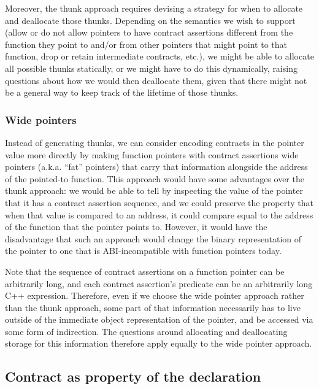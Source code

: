 Moreover, the thunk approach requires devising a strategy for when to allocate and deallocate those thunks. Depending on the semantics we wish to support (allow or do not allow pointers to have contract assertions different from the function they point to and/or from other pointers that might point to that function, drop or retain intermediate contracts, etc.), we might be able to allocate all possible thunks statically, or we might have to do this dynamically, raising questions about how we would then deallocate them, given that there might not be a general way to keep track of the lifetime of those thunks.


\subsubsection{Wide pointers}

Instead of generating thunks, we can consider encoding contracts in the pointer value more directly by making function pointers with contract assertions wide pointers (a.k.a. ``fat'' pointers) that carry that information alongside the address of the pointed-to function. This approach would have some advantages over the thunk approach: we would be able to tell by inspecting the value of the pointer that it has a contract assertion sequence, and we could preserve the property that when that value is compared to an address, it could compare equal to the address of the function that the pointer points to. However, it would have the disadvantage that such an approach would change the binary representation of the pointer to one that is ABI-incompatible with function pointers today.

Note that the sequence of contract assertions on a function pointer can be arbitrarily long, and each contract assertion's predicate can be an arbitrarily long C++ expression. Therefore, even if we choose the wide pointer approach rather than the thunk approach, some part of that information necessarily has to live outside of the immediate object representation of the pointer, and be accessed via some form of indirection. The questions around allocating and deallocating storage for this information therefore apply equally to the wide pointer approach.


\subsection{Contract as property of the declaration}
\label{decl}

